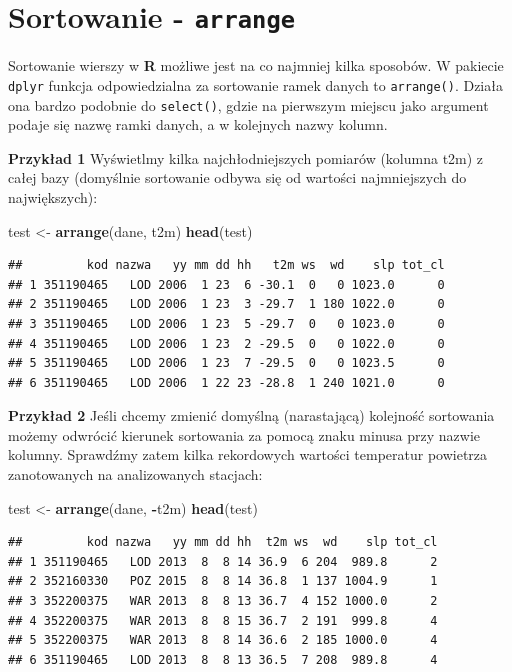 \documentclass[]{book}
\newenvironment{Shaded}{\begin{snugshade}}{\end{snugshade}}
\newcommand{\KeywordTok}[1]{\textcolor[rgb]{0.13,0.29,0.53}{\textbf{#1}}}
\newcommand{\StringTok}[1]{\textcolor[rgb]{0.31,0.60,0.02}{#1}}
\newcommand{\OperatorTok}[1]{\textcolor[rgb]{0.81,0.36,0.00}{\textbf{#1}}}
\newcommand{\NormalTok}[1]{#1}
\theoremstyle{definition}
\theoremstyle{definition}
\theoremstyle{definition}
\theoremstyle{remark}
\begin{document}
\section{\texorpdfstring{Sortowanie -
\texttt{arrange}}{Sortowanie - arrange}}\label{sortowanie---arrange}

Sortowanie wierszy w \textbf{R} możliwe jest na co najmniej kilka
sposobów. W pakiecie \texttt{dplyr} funkcja odpowiedzialna za sortowanie
ramek danych to \texttt{arrange()}. Działa ona bardzo podobnie do
\texttt{select()}, gdzie na pierwszym miejscu jako argument podaje się
nazwę ramki danych, a w kolejnych nazwy kolumn.

\textbf{Przykład 1} Wyświetlmy kilka najchłodniejszych pomiarów (kolumna
t2m) z całej bazy (domyślnie sortowanie odbywa się od wartości
najmniejszych do największych):

\begin{Shaded}
\begin{Highlighting}[]
\NormalTok{test <-}\StringTok{ }\KeywordTok{arrange}\NormalTok{(dane, t2m)}
\KeywordTok{head}\NormalTok{(test)}
\end{Highlighting}
\end{Shaded}

\begin{verbatim}
##         kod nazwa   yy mm dd hh   t2m ws  wd    slp tot_cl
## 1 351190465   LOD 2006  1 23  6 -30.1  0   0 1023.0      0
## 2 351190465   LOD 2006  1 23  3 -29.7  1 180 1022.0      0
## 3 351190465   LOD 2006  1 23  5 -29.7  0   0 1023.0      0
## 4 351190465   LOD 2006  1 23  2 -29.5  0   0 1022.0      0
## 5 351190465   LOD 2006  1 23  7 -29.5  0   0 1023.5      0
## 6 351190465   LOD 2006  1 22 23 -28.8  1 240 1021.0      0
\end{verbatim}

\textbf{Przykład 2} Jeśli chcemy zmienić domyślną (narastającą)
kolejność sortowania możemy odwrócić kierunek sortowania za pomocą znaku
minusa przy nazwie kolumny. Sprawdźmy zatem kilka rekordowych wartości
temperatur powietrza zanotowanych na analizowanych stacjach:

\begin{Shaded}
\begin{Highlighting}[]
\NormalTok{test <-}\StringTok{ }\KeywordTok{arrange}\NormalTok{(dane, }\OperatorTok{-}\NormalTok{t2m)}
\KeywordTok{head}\NormalTok{(test)}
\end{Highlighting}
\end{Shaded}

\begin{verbatim}
##         kod nazwa   yy mm dd hh  t2m ws  wd    slp tot_cl
## 1 351190465   LOD 2013  8  8 14 36.9  6 204  989.8      2
## 2 352160330   POZ 2015  8  8 14 36.8  1 137 1004.9      1
## 3 352200375   WAR 2013  8  8 13 36.7  4 152 1000.0      2
## 4 352200375   WAR 2013  8  8 15 36.7  2 191  999.8      4
## 5 352200375   WAR 2013  8  8 14 36.6  2 185 1000.0      4
## 6 351190465   LOD 2013  8  8 13 36.5  7 208  989.8      4
\end{verbatim}
\end{document}
